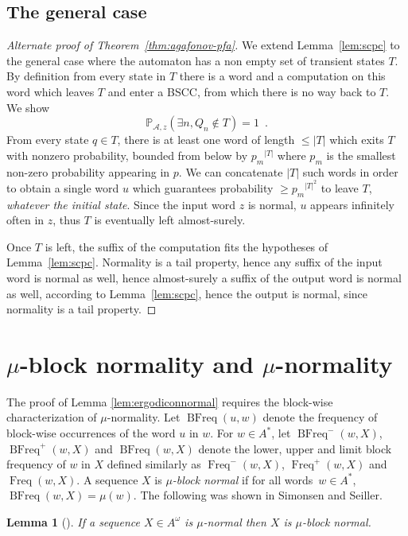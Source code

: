 \documentclass[11pt]{article}
\newtheorem{lemma}{Lemma}
\newcommand{\A}{\mathcal{A}}
\newcommand{\PP}{\mathbb{P}}
\DeclareMathOperator{\freq}{Freq}
\DeclareMathOperator{\bfreq}{BFreq}
\begin{document}
\subsection{The general case}

\begin{proof}[Alternate proof of Theorem~\ref{thm:agafonov-pfa}]
We extend Lemma~\ref{lem:scpc}
to the general case
where the automaton has a non empty set of transient states $T$.
By definition from every state in $T$ there is a word and a computation
on this word which leaves $T$ and enter a BSCC,
from which there is no way back to $T$.
We show
\[
\PP_{\A,z}(\exists n , Q_n \not \in T) = 1\enspace.
\]
From every state $q\in T$,
there is at least one word of length $\leq |T|$ which 
exits $T$ 
with nonzero probability,
bounded from below by ${p_m}^{|T|}$ where $p_m$
is the smallest non-zero probability appearing in $p$.
We can concatenate $|T|$ such words in order to obtain a single word
$u$ which guarantees probability $\geq {p_m}^{|T|^2}$ to leave $T$,
 \emph{whatever the initial state}. 
Since the input word $z$ is normal, $u$ appears infinitely often in $z$,
thus $T$ is eventually left almost-surely.

Once $T$ is left, the suffix of the computation
fits the hypotheses of Lemma~\ref{lem:scpc}.
Normality is a tail property,
hence any suffix of the input word is normal as well,
hence almost-surely a suffix of the output word is normal as well, according to Lemma~\ref{lem:scpc},
hence the output is normal, since normality is a tail property.
\end{proof}


\section{$\mu$-block normality and $\mu$-normality}
\label{sec:blocknormality}

The proof of Lemma \ref{lem:ergodiconnormal} requires the block-wise characterization of $\mu$-normality. Let $\bfreq(u,w)$ denote the frequency of block-wise occurrences of the word $u$ in $w$. For $w \in A^*$, let $\bfreq^-(w,X)$, $\bfreq^+(w,X)$ and $\bfreq(w,X)$ denote the lower, upper and limit block frequency of $w$ in $X$ defined similarly as $\freq^-(w,X)$, $\freq^+(w,X)$ and $\freq(w,X)$. A sequence $X$ is \emph{$\mu$-block normal} if for all words~$w \in A^*$, $\bfreq(w,X)=\mu(w)$. The following was shown in Simonsen and Seiller.

\begin{lemma}[\cite{SeillerS2020}]
	If a sequence $X \in A^\omega$ is $\mu$-normal then $X$ is $\mu$-block normal.
\end{lemma}
\end{document}
